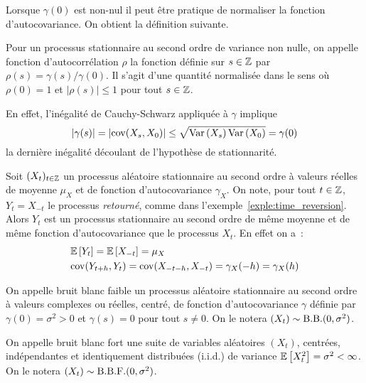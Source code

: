 Lorsque $\gamma(0)$ est non-nul il peut \^{e}tre pratique de normaliser la fonction
d'autocovariance. On obtient la d\'efinition suivante.
\begin{definition}
  Pour un processus stationnaire au second ordre de variance non nulle, on
  appelle fonction d'autocorr\'elation $\rho$ la fonction d\'efinie sur $s\in\mathbb{Z}$
  par $\rho(s)= \gamma(s)/\gamma(0)$. Il s'agit d'une quantit\'e normalis\'ee dans
  le sens o\`u $\rho(0) = 1$ et $|\rho(s)| \leq 1$ pour tout $s\in\mathbb{Z}$.
\end{definition}
En effet, l'in\'egalit\'e de Cauchy-Schwarz  appliqu\'ee \`a $\gamma$ implique
\[
 |\gamma(s)|
  = \left|\mathrm{cov}(X_{s},X_0)\right| \leq
    \sqrt{\mathrm{Var}\left( X_{s} \right)\mathrm{Var}\left( X_0 \right)} = \gamma(0)
\]
la derni\`ere in\'egalit\'e d\'ecoulant de l'hypoth\`ese de
stationnarit\'e.%
\begin{example}
  \label{exe:stat_retourne} Soit $(X_t)_{t\in\mathbb{Z}}$ un processus al\'eatoire
  stationnaire au second ordre \`a valeurs r\'eelles de moyenne $\mu_X$ et de
  fonction d'autocovariance $\gamma_X$. On note, pour tout $t\in\mathbb{Z}$,
  $Y_t=X_{-t}$ le processus {\it retourn\'e}, comme dans
  l'exemple~\ref{exple:time_reversion}. Alors $Y_t$ est un processus
  stationnaire au second ordre de m\^{e}me moyenne et de m\^{e}me fonction
  d'autocovariance que le processus $X_t$. En effet on a~:
 \begin{align*}
  &{\mathbb E}\left[ Y_t \right]= {\mathbb E}\left[ X_{-t} \right]=\mu_X\\
  &\mathrm{cov}(Y_{t+h},Y_t)=\mathrm{cov}(X_{-t-h},X_{-t})=\gamma_X(-h)=\gamma_X(h)
 \end{align*}
\end{example}
\begin{definition}
  On appelle bruit blanc faible un processus al\'eatoire stationnaire au second
  ordre \`a valeurs complexes ou r\'eelles, centr\'e, de fonction d'autocovariance
  $\gamma$ d\'efinie par $\gamma(0)= \sigma^2>0$ et $\gamma(s)=0$  pour tout
  $s\neq0$. On le notera $ (X_{t}) \sim  \mathrm{B.B.}(0,\sigma^2)$.
\end{definition}
\begin{definition}
On appelle bruit blanc fort une suite de variables
al\'eatoires $(X_{t})$, centr\'ees, ind\'ependantes et identiquement
distribu\'ees (i.i.d.) de variance ${\mathbb E}\left[ X_{t}^2 \right] = \sigma^2 <
\infty$. On le notera $ (X_{t}) \sim \mathrm{B.B.F.}(0,\sigma^2)$.
\end{definition}
